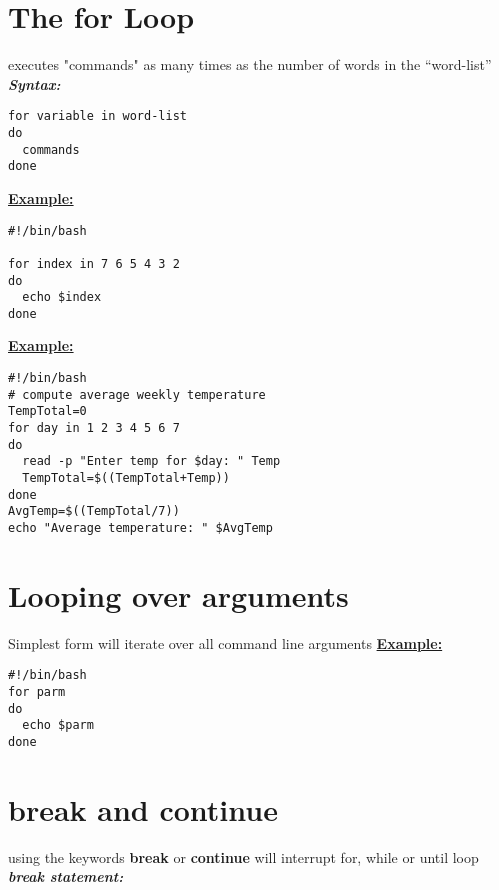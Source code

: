 \documentclass{report}
\begin{document}
\section{The for Loop}
executes "commands" as many times as the number of words in the ``word-list''
\bigbreak \noindent
\textit{\textbf{Syntax:}}
\begin{verbatim}
for variable in word-list
do
  commands
done
\end{verbatim}
\bigbreak \noindent
\textbf{\underline{Example:}}
\begin{mdframed}
  \begin{verbatim}
#!/bin/bash

for index in 7 6 5 4 3 2
do
  echo $index
done
\end{verbatim}
\end{mdframed}
\clearpage \noindent
\textbf{\underline{Example:}}
\begin{mdframed}
\begin{verbatim}
#!/bin/bash
# compute average weekly temperature
TempTotal=0
for day in 1 2 3 4 5 6 7
do
  read -p "Enter temp for $day: " Temp
  TempTotal=$((TempTotal+Temp))
done
AvgTemp=$((TempTotal/7))
echo "Average temperature: " $AvgTemp
\end{verbatim}
\end{mdframed}
\section{Looping over arguments}
Simplest form will iterate over all command line arguments
\bigbreak \noindent
\textbf{\underline{Example:}}
\begin{mdframed}
\begin{verbatim}
#!/bin/bash
for parm
do
  echo $parm
done
\end{verbatim}
\end{mdframed}
\section{break and continue}
using the keywords \textbf{break} or \textbf{continue} will interrupt for, while or until loop
\bigbreak \noindent
\textit{\textbf{break statement:}} \vspace{1.5mm}
\end{document}
